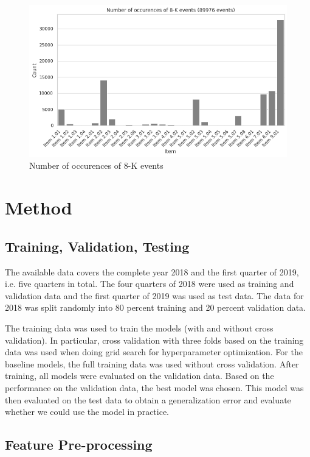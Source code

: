 \documentclass{article}
\begin{document}
	\begin{figure}[h!]
		\includegraphics[width=\linewidth]{img/dist_8k_events.png}
		\caption{Number of occurences of 8-K events}
		\label{fig:dist_8k_events}
	\end{figure}


	\section{Method}
	
	\subsection{Training, Validation, Testing}
	
	The available data covers the complete year 2018 and the first quarter of 2019, i.e. five quarters in total. The four quarters of 2018 were used as training and validation data and the first quarter of 2019 was used as test data. The data for 2018 was split randomly into 80 percent training and 20 percent validation data. 
	
	The training data was used to train the models (with and without cross validation). In particular, cross validation with three folds based on the training data was used when doing grid search for hyperparameter optimization. For the baseline models, the full training data was used without cross validation. After training, all models were evaluated on the validation data. Based on the performance on the validation data, the best model was chosen. This model was then evaluated on the test data to obtain a generalization error and evaluate whether we could use the model in practice. 
	
	\subsection{Feature Pre-processing}
	
\end{document}
